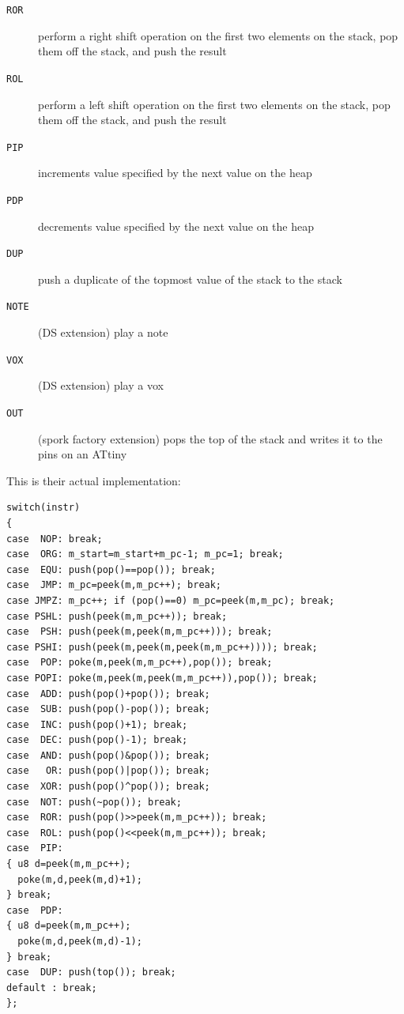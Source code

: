 \documentclass[letterpaper, 12pt]{article}
\begin{document}
\begin{description}
\item[\texttt{ROR}] perform a right shift operation on the first two elements on the stack, pop them off the stack, and push the result
\item[\texttt{ROL}] perform a left shift operation on the first two elements on the stack, pop them off the stack, and push the result
\item[\texttt{PIP}] increments value specified by the next value on the heap
\item[\texttt{PDP}] decrements value specified by the next value on the heap
\item[\texttt{DUP}] push a duplicate of the topmost value of the stack to the stack
\item[\texttt{NOTE}] (DS extension) play a note
\item[\texttt{VOX}] (DS extension) play a vox
\item[\texttt{OUT}] (spork factory extension) pops the top of the stack and writes it to the pins on %
an ATtiny
\end{description}
This is their actual implementation:

\begin{Verbatim}[fontfamily=courier, xleftmargin=\parindent]
switch(instr)
{
case  NOP: break;
case  ORG: m_start=m_start+m_pc-1; m_pc=1; break;
case  EQU: push(pop()==pop()); break;
case  JMP: m_pc=peek(m,m_pc++); break;
case JMPZ: m_pc++; if (pop()==0) m_pc=peek(m,m_pc); break;
case PSHL: push(peek(m,m_pc++)); break;
case  PSH: push(peek(m,peek(m,m_pc++))); break;
case PSHI: push(peek(m,peek(m,peek(m,m_pc++)))); break;
case  POP: poke(m,peek(m,m_pc++),pop()); break;
case POPI: poke(m,peek(m,peek(m,m_pc++)),pop()); break;
case  ADD: push(pop()+pop()); break;
case  SUB: push(pop()-pop()); break;
case  INC: push(pop()+1); break;
case  DEC: push(pop()-1); break;
case  AND: push(pop()&pop()); break;
case   OR: push(pop()|pop()); break;
case  XOR: push(pop()^pop()); break;
case  NOT: push(~pop()); break;
case  ROR: push(pop()>>peek(m,m_pc++)); break;
case  ROL: push(pop()<<peek(m,m_pc++)); break;
case  PIP: 
{ u8 d=peek(m,m_pc++);
  poke(m,d,peek(m,d)+1);
} break;
case  PDP:
{ u8 d=peek(m,m_pc++);
  poke(m,d,peek(m,d)-1);
} break;
case  DUP: push(top()); break;
default : break;
};
\end{Verbatim}


\vspace*{24pt}
\end{document}
